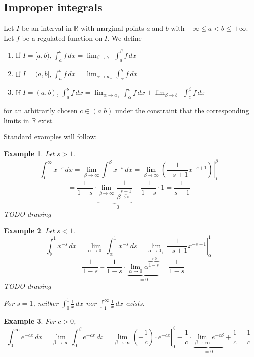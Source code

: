 \documentclass{article}
\newtheorem{example}{Example}  \numberwithin{example}{section}
\begin{document}
\subsection{Improper integrals}

Let $I$ be an interval in $\mathbb R$ with marginal points $a$ and $b$ with $-\infty \leq a < b \leq +\infty$.
Let $f$ be a regulated function on $I$.
We define
\begin{enumerate}
  \item If $I = [a,b)$, $\int_a^b f \, dx = \lim_{\beta \to b_-} \int_a^\beta f \, dx$
  \item If $I = (a,b]$, $\int_a^b f \, dx = \lim_{\alpha \to a_+} \int_\alpha^b f \, dx$
  \item If $I = (a,b)$, $\int_a^b f \, dx = \lim_{\alpha \to a_+} \int_\alpha^c f \, dx + \lim_{\beta \to b_-} \int_c^\beta f \, dx$
\end{enumerate}
for an arbitrarily chosen $c \in (a,b)$ under the constraint that the corresponding limits in $\mathbb R$ exist.

Standard examples will follow:
\begin{example}
  Let $s > 1$.
  \[ \int_1^\infty x^{-s} \, dx = \lim_{\beta \to \infty} \int_1^\beta x^{-s} \, dx = \left.\lim_{\beta \to \infty} \left(\frac{1}{-s + 1} x^{-s+1}\right) \right|_1^\beta \]
  \[ = \frac1{1 - s} \cdot \underbrace{\lim_{\beta \to \infty} \frac{1}{\beta^{\underbrace{s-1}_{> 0}}}}_{= 0} - \frac{1}{1 - s} \cdot 1 = \frac{1}{s-1} \]
  TODO drawing
\end{example}

\begin{example}
  Let $s < 1$.
  \[
    \int_0^1 x^{-s} \, dx = \lim_{\alpha \to 0_+} \int_\alpha^1 x^{-s} \, ds
    = \left. \lim_{\alpha\to 0_+} \frac{1}{-s + 1} x^{-s+1} \right|_\alpha^1
  \] \[
    = \frac1{1 - s} - \frac1{1 - s} \cdot \underbrace{\lim_{\alpha \to 0} \alpha^{\overbrace{1 - s}^{> 0}}}_{= 0} = \frac1{1 - s}
  \]
  TODO drawing

  For $s = 1$, neither $\int_0^1 \frac1x \, dx$ nor $\int_1^\infty \frac1x \, dx$ exists.
\end{example}

\begin{example}
  For $c > 0$,
  \[ \int_0^\infty e^{-cx} \, dx = \lim_{\beta \to \infty} \int_0^\beta e^{-cx} \, dx = \left. \lim_{\beta \to \infty} \left(-\frac1c\right) \cdot e^{-cx} \right|_0^\beta - \frac1c \cdot \underbrace{\lim_{\beta \to \infty} e^{-c\beta}}_{= 0} + \frac1c = \frac1c \]
\end{example}
\end{document}
